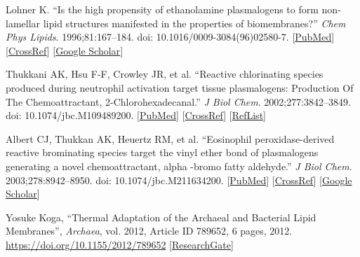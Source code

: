 \documentclass[11pt]{scrartcl}
\begin{document}
		\begin{thebibliography}{}
			 Lohner K. ``Is the high propensity of ethanolamine plasmalogens to form non-lamellar lipid structures manifested in the properties of biomembranes?'' \emph{Chem Phys Lipids}. 1996;81:167–184. doi: 10.1016/0009-3084(96)02580-7. [\href{https://www.ncbi.nlm.nih.gov/pubmed/8810047}{PubMed}] [\href{https://dx.doi.org/10.1016%2F0009-3084(96)02580-7}{CrossRef}] [\href{https://scholar.google.com/scholar_lookup?journal=Chem+Phys+Lipids&title=Is+the+high+propensity+of+ethanolamine+plasmalogens+to+form+non-lamellar+lipid+structures+manifested+in+the+properties+of+biomembranes?&author=K+Lohner&volume=81&publication_year=1996&pages=167-184&pmid=8810047&doi=10.1016/0009-3084(96)02580-7&}{Google Scholar}]
			
			 Thukkani AK, Hsu F-F, Crowley JR, et al. ``Reactive chlorinating species produced during neutrophil activation target tissue plasmalogens: Production Of The Chemoattractant, 2-Chlorohexadecanal.'' \emph{J Biol Chem}. 2002;277:3842–3849. doi: 10.1074/jbc.M109489200. [\href{https://www.ncbi.nlm.nih.gov/pubmed/11724792}{PubMed}] [\href{https://dx.doi.org/10.1074%2Fjbc.M109489200}{CrossRef}] [\href{https://www.ncbi.nlm.nih.gov/pmc/articles/PMC5818364/#CR88}{RefList}]
			
			 Albert CJ, Thukkan AK, Heuertz RM, et al. ``Eosinophil peroxidase-derived reactive brominating species target the vinyl ether bond of plasmalogens generating a novel chemoattractant, alpha -bromo fatty aldehyde.'' \emph{J Biol Chem}. 2003;278:8942–8950. doi: 10.1074/jbc.M211634200. [\href{https://www.ncbi.nlm.nih.gov/pubmed/12643282}{PubMed}] [\href{https://dx.doi.org/10.1074%2Fjbc.M211634200}{CrossRef}] [\href{https://scholar.google.com/scholar_lookup?journal=J+Biol+Chem&title=Eosinophil+peroxidase-derived+reactive+brominating+species+target+the+vinyl+ether+bond+of+plasmalogens+generating+a+novel+chemoattractant,+alpha+-bromo+fatty+aldehyde&author=CJ+Albert&author=AK+Thukkan&author=RM+Heuertz&volume=278&publication_year=2003&pages=8942-8950&pmid=12643282&doi=10.1074/jbc.M211634200&}{Google Scholar}]
			
			 Yosuke Koga, ``Thermal Adaptation of the Archaeal and Bacterial Lipid Membranes'', \emph{Archaea}, vol. 2012, Article ID 789652, 6 pages, 2012. \url{https://doi.org/10.1155/2012/789652} [\href{https://www.researchgate.net/publication/230749321_Thermal_Adaptation_of_the_Archaeal_and_Bacterial_Lipid_Membranes?_sg%5B1%5D=zN9asPMgXeArrcCwtMWMJQ2CBvdV4aYmYzHm1bEwOTsZsfLwXkaelxrj_lfYaOmcMk5Ca1islg}{ResearchGate}]
			

\end{thebibliography}
\end{document}
